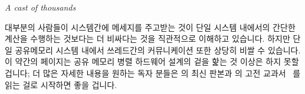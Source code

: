 
%
	 {\emph{A cast of thousands}}

대부분의 사람들이 시스템간에 메세지를 주고받는 것이 단일 시스템 내에서의 간단한
계산을 수행하는 것보다는 더 비싸다는 것을 직관적으로 이해하고 있습니다.
하지만 단일 공유메모리 시스템 내에서 쓰레드간의 커뮤니케이션 또한 상당히 비쌀
수 있습니다.
이 약간의 페이지는 공유 메모리 병렬 하드웨어 설계의 겉을 핥는 것 이상은 하지
못할 겁니다; 더 많은 자세한 내용을 원하는 독자 분들은  의 최신 판본과  의 고전
교과서~\cite{Hennessy2017,Hennessy95a} 를 읽는 걸로 시작하면 좋을 겁니다.

\iffalse

Most people intuitively understand that passing messages between systems
is more expensive than performing simple calculations within the confines
of a single system.
But it is also the case that communicating among threads within the
confines of a single shared-memory system can also be quite expensive.
This chapter therefore looks at the cost of synchronization and communication
within a shared-memory system.
These few pages can do no more than scratch the surface of shared-memory
parallel hardware design; readers desiring more detail would do well
to start with a recent edition of \pplsur{John L.}{Hennessy}'s and
\pplsur{David A.}{Patterson}'s classic
text~\cite{Hennessy2017,Hennessy95a}.

\fi

